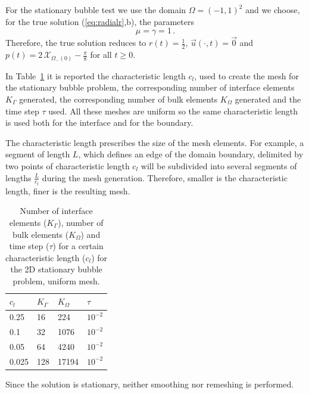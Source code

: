 \documentclass[a4paper,12pt,onecolumn]{article}
\newcommand{\bigchi}{\ensuremath{\mathrm{\mathcal{X}}}}
\newcommand{\charfcn}[1]{\bigchi_{#1}} %
\begin{document}
For the stationary bubble test we use the domain $\Omega = (-1,1)^2$ and we
choose, for the true solution (\ref{eq:radialr},b), the parameters
\begin{equation*}
\mu = \gamma = 1\,.
\end{equation*}
Therefore, the true solution reduces to $r(t) = \frac{1}{2}$, $\vec u(\cdot, t)
= \vec 0$ and $p(t) = 2\,\charfcn{\Omega_-(0)} - \frac{\pi}{8}$ for all $t \geq
0$.

In Table~\ref{tab:bubble2Delementsuniform} it is reported the characteristic
length $c_l$, used to create the mesh for the stationary bubble problem, the
corresponding number of interface elements $K_\Gamma$ generated, the
corresponding number of bulk elements $K_\Omega$ generated and the time step
$\tau$ used. All these meshes are uniform so the same characteristic length is
used both for the interface and for the boundary.

The characteristic length prescribes the size of the mesh elements. For
example, a segment of length $L$, which defines an edge of the domain boundary,
delimited by two points of characteristic length $c_l$ will be subdivided into
several segments of lengths $\frac{L}{c_l}$ during the mesh generation.
Therefore, smaller is the characteristic length, finer is the resulting mesh.
\begin{table}
 \center
\begin{tabular}{llll}
\hline
$c_l$ & $K_\Gamma$ & $K_\Omega$ & $\tau$ \\
\hline
0.25 & 16 & 224 & $10^{-2}$ \\
0.1 & 32 & 1076 & $10^{-2}$\\
0.05 & 64 & 4240 & $10^{-2}$\\
0.025 & 128 & 17194 & $10^{-2}$ \\
\hline
\end{tabular}
\caption{Number of interface elements ($K_\Gamma$), number of bulk elements
($K_\Omega$) and time step ($\tau$) for a certain characteristic length ($c_l$)
for the 2D stationary bubble problem, uniform mesh.}
\label{tab:bubble2Delementsuniform}
\end{table}

Since the solution is stationary, neither smoothing nor remeshing is performed.
\end{document}
